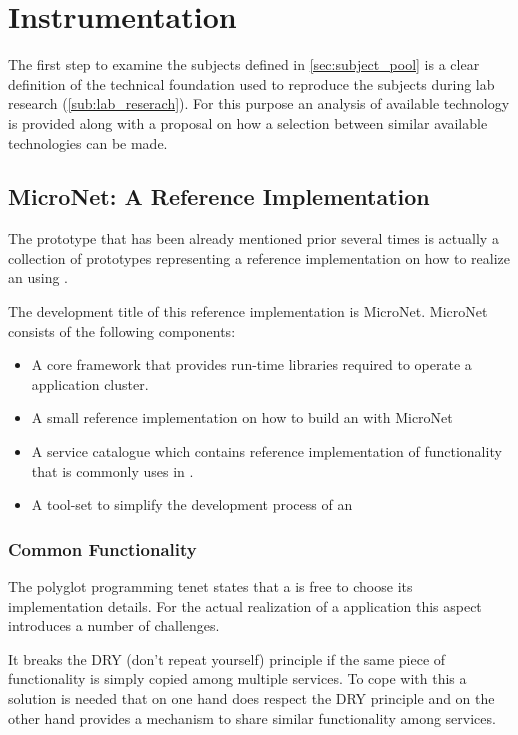\section{Instrumentation}
\label{sub:instrumentation}

The first step to examine the subjects defined in \autoref{sec:subject_pool} is
a clear definition of the technical foundation used to reproduce the subjects
during lab research (\autoref{sub:lab_reserach}). For this purpose an analysis
of available technology is provided along with a proposal on how a selection
between similar available technologies can be made.

\subsection{MicroNet: A Reference Implementation}

The prototype that has been already mentioned prior 
several times is actually a collection of prototypes representing a reference
implementation on how to realize an \og{} using \ms{}.

The development title of this reference implementation is MicroNet.
MicroNet consists of the following components:

\begin{itemize}
  \item A core framework that provides run-time libraries required to operate a
  \ms{} \og{} application cluster.
  \item A small reference implementation on how to build an \og{} with MicroNet
  \item A service catalogue which contains reference implementation of
  functionality that is commonly uses in \ogs{}.
  \item A tool-set to simplify the development process of an \og{} 
\end{itemize}

\subsubsection{Common Functionality}

The polyglot programming tenet states that a \ms{} is free to choose its
implementation details. For the actual realization of a \ms{} application
this aspect introduces a number of challenges. 

It breaks the DRY (don't repeat yourself) principle if the same piece of
functionality is simply copied among multiple services. To cope with this a
solution is needed that on one hand does respect the DRY principle and on the
other hand provides a mechanism to share similar functionality among services.

